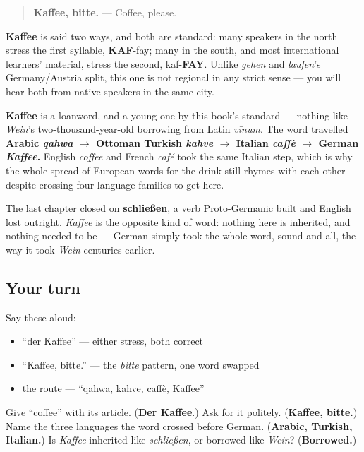 \begin{quote}
\textbf{Kaffee, bitte.} — Coffee, please.
\end{quote}

\begin{sounds}
\textbf{Kaffee} is said two ways, and both are standard: many speakers in the north stress the first syllable, \textbf{KAF}-fay; many in the south, and most international learners' material, stress the second, kaf-\textbf{FAY}. Unlike \emph{gehen} and \emph{laufen}'s Germany/Austria split, this one is not regional in any strict sense — you will hear both from native speakers in the same city.
\end{sounds}

\begin{cousinweb}
\textbf{Kaffee} is a loanword, and a young one by this book's standard — nothing like \emph{Wein}'s two-thousand-year-old borrowing from Latin \emph{vīnum}. The word travelled \textbf{Arabic \emph{qahwa} $\to$ Ottoman Turkish \emph{kahve} $\to$ Italian \emph{caffè} $\to$ German \emph{Kaffee}.} English \emph{coffee} and French \emph{café} took the same Italian step, which is why the whole spread of European words for the drink still rhymes with each other despite crossing four language families to get here.

The last chapter closed on \textbf{schließen}, a verb Proto-Germanic built and English lost outright. \emph{Kaffee} is the opposite kind of word: nothing here is inherited, and nothing needed to be — German simply took the whole word, sound and all, the way it took \emph{Wein} centuries earlier.
\end{cousinweb}

\subsection*{Your turn}
Say these aloud:

\begin{itemize}
\raggedright
  \item \textquotedblleft{}der Kaffee\textquotedblright{} — either stress, both correct
  \item \textquotedblleft{}Kaffee, bitte.\textquotedblright{} — the \emph{bitte} pattern, one word swapped
  \item the route — \textquotedblleft{}qahwa, kahve, caffè, Kaffee\textquotedblright{}
\end{itemize}

\begin{tcolorbox}[breakable,colback=teal!4,colframe=teal!35!black,title={Before you move on}]
Give \textquotedblleft{}coffee\textquotedblright{} with its article. (\textbf{Der Kaffee}.) Ask for it politely. (\textbf{Kaffee, bitte.}) Name the three languages the word crossed before German. (\textbf{Arabic, Turkish, Italian.}) Is \emph{Kaffee} inherited like \emph{schließen}, or borrowed like \emph{Wein}? (\textbf{Borrowed.})
\end{tcolorbox}
